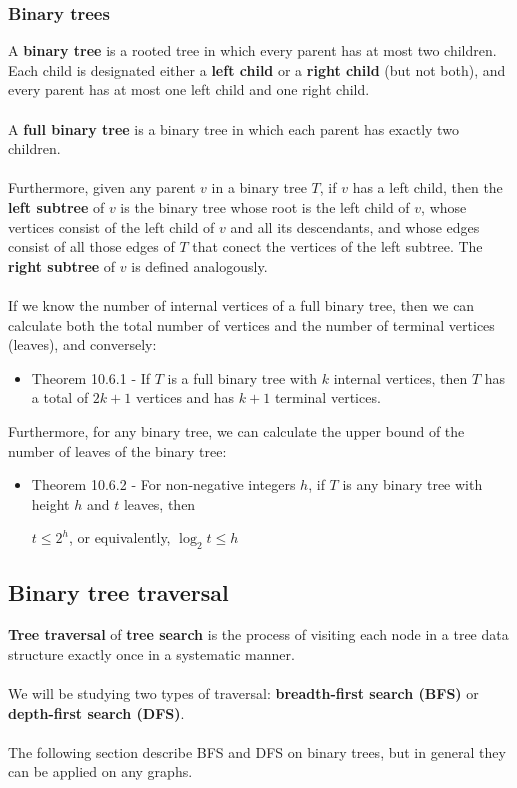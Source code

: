 \documentclass[a4paper]{article}
\begin{document}
\subsubsection{Binary trees}
A \textbf{binary tree} is a rooted tree in which every parent has at most two children. Each child is designated either a \textbf{left child} or a \textbf{right child} (but not both), and every parent has at most one left child and one right child.\\\\
A \textbf{full binary tree} is a binary tree in which each parent has exactly two children.\\\\
Furthermore, given any parent $v$ in a binary tree $T$, if $v$ has a left child, then the \textbf{left subtree} of $v$ is the binary tree whose root is the left child of $v$, whose vertices consist of the left child of $v$ and all its descendants, and whose edges consist of all those edges of $T$ that conect the vertices of the left subtree. The \textbf{right subtree} of $v$ is defined analogously.\\\\
If we know the number of internal vertices of a full binary tree, then we can calculate both the total number of vertices and the number of terminal vertices (leaves), and conversely:
\begin{itemize}
	\item[] Theorem 10.6.1 - If $T$ is a full binary tree with $k$ internal vertices, then $T$ has a total of $2k+1$ vertices and has $k+1$ terminal vertices. 
\end{itemize}
Furthermore, for any binary tree, we can calculate the upper bound of the number of leaves of the binary tree:
\begin{itemize}
	\item[] Theorem 10.6.2 - For non-negative integers $h$, if $T$ is any binary tree with height $h$ and $t$ leaves, then
	\begin{center}
		$t\le 2^h$, or equivalently, $\log_2{t} \le h$
	\end{center}
\end{itemize}

\subsection{Binary tree traversal}
\textbf{Tree traversal} of \textbf{tree search} is the process of visiting each node in a tree data structure exactly once in a systematic manner.\\\\
We will be studying two types of traversal: \textbf{breadth-first search (BFS)} or \textbf{depth-first search (DFS)}.\\\\
The following section describe BFS and DFS on binary trees, but in general they can be applied on any graphs.
\end{document}

